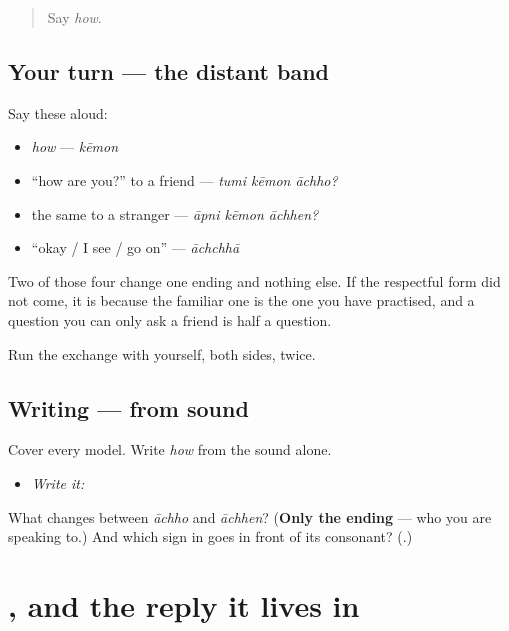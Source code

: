 \label{lesson:BN-R01-kemon-again}



\begin{quote}
Say \emph{how}.
\end{quote}

\subsection*{Your turn — the distant band}
Say these aloud:

\begin{itemize}
\raggedright
  \item \emph{how} — \emph{kēmon}
  \item \textquotedblleft{}how are you?\textquotedblright{} to a friend — \emph{tumi kēmon āchho?}
  \item the same to a stranger — \emph{āpni kēmon āchhen?}
  \item \textquotedblleft{}okay / I see / go on\textquotedblright{} — \emph{āchchhā}
\end{itemize}

Two of those four change one ending and nothing else. If the respectful form did not come, it is because the familiar one is the one you have practised, and a question you can only ask a friend is half a question.

Run the exchange with yourself, both sides, twice.

\subsection*{Writing — from sound}
Cover every model. Write \emph{how} from the sound alone.

\begin{itemize}
\raggedright
  \item \emph{Write it:} 
\end{itemize}

\begin{tcolorbox}[breakable,colback=teal!4,colframe=teal!35!black,title={Before you move on}]
What changes between \emph{āchho} and \emph{āchhen}? (\textbf{Only the ending} — who you are speaking to.) And which sign in \textbf{} goes in front of its consonant? (\textbf{}.)
\end{tcolorbox}
\section[Practice]{, and the reply it lives in}

